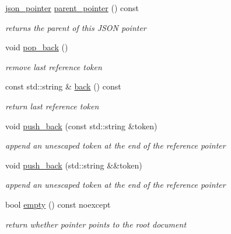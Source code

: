 \begin{DoxyCompactItemize}
\mbox{\hyperlink{classnlohmann_1_1json__pointer}{json\+\_\+pointer}} \mbox{\hyperlink{classnlohmann_1_1json__pointer_afdaacce1edb7145e0434e014f0e8685a}{parent\+\_\+pointer}} () const
\begin{DoxyCompactList}\small\item\em returns the parent of this J\+S\+ON pointer \end{DoxyCompactList}\item 
void \mbox{\hyperlink{classnlohmann_1_1json__pointer_a4b1ee4d511ca195bed896a3da47e264c}{pop\+\_\+back}} ()
\begin{DoxyCompactList}\small\item\em remove last reference token \end{DoxyCompactList}\item 
const std\+::string \& \mbox{\hyperlink{classnlohmann_1_1json__pointer_a213bc67c32a30c68ac6bf06f5195d482}{back}} () const
\begin{DoxyCompactList}\small\item\em return last reference token \end{DoxyCompactList}\item 
void \mbox{\hyperlink{classnlohmann_1_1json__pointer_a697d12b5bd6205f8866691b166b7c7dc}{push\+\_\+back}} (const std\+::string \&token)
\begin{DoxyCompactList}\small\item\em append an unescaped token at the end of the reference pointer \end{DoxyCompactList}\item 
void \mbox{\hyperlink{classnlohmann_1_1json__pointer_ac228b13596d3c34185da9fe61b570194}{push\+\_\+back}} (std\+::string \&\&token)
\begin{DoxyCompactList}\small\item\em append an unescaped token at the end of the reference pointer \end{DoxyCompactList}\item 
bool \mbox{\hyperlink{classnlohmann_1_1json__pointer_a649252bda4a2e75a0915b11a25d8bcc3}{empty}} () const noexcept
\begin{DoxyCompactList}\small\item\em return whether pointer points to the root document \end{DoxyCompactList}\end{DoxyCompactItemize}
